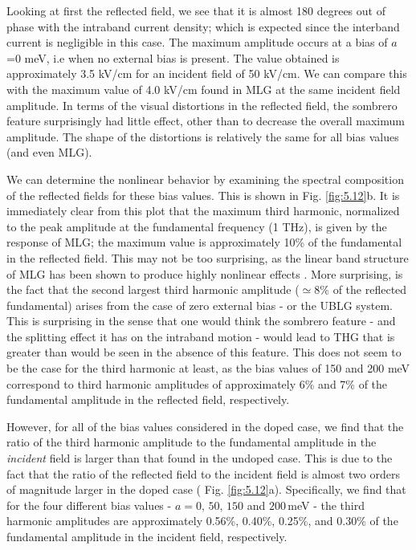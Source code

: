 \documentclass[twocolumn,secnumarabic,amssymb, nobibnotes, aps, prd, superscriptaddress]{revtex4-1}
\begin{document}
Looking at first the reflected field, we see that it is almost 180 degrees out of phase with the intraband current density; which is expected since the interband current is negligible in this case. The maximum amplitude occurs at a bias of $a$=0 meV, i.e when no external bias is present. The value obtained is approximately 3.5 kV/cm for an incident field of 50 kV/cm. We can compare this with the maximum value of 4.0 kV/cm found in MLG at the same incident field amplitude. In terms of the visual distortions in the reflected field, the sombrero feature surprisingly had little effect, other than to decrease the overall maximum amplitude. The shape of the distortions is relatively the same for all bias values (and even MLG). 

We can determine the nonlinear behavior by examining the spectral composition of the reflected fields for these bias values. This is shown in Fig. \ref{fig:5.12}b. It is immediately clear from this plot that the maximum third harmonic, normalized to the peak amplitude at the fundamental frequency (1 THz), is given by the response of MLG; the maximum value is approximately 10\% of the fundamental in the reflected field. This may not be too surprising, as the linear band structure of MLG has been shown to produce highly nonlinear effects \cite{al2014high}\cite{al2015nonperturbative}\cite{al2015optimizing}. More surprising, is the fact that the second largest third harmonic amplitude ($\simeq8\%$ of the reflected fundamental) arises from the case of zero external bias - or the UBLG system. This is surprising in the sense that one would think the sombrero feature - and the splitting effect it has on the intraband motion - would lead to THG that is greater than would be seen in the absence of this feature. This does not seem to be the case for the third harmonic at least, as the bias values of 150 and 200 meV correspond to third harmonic amplitudes of approximately 6\% and 7\% of the fundamental amplitude in the reflected field, respectively. 

However, for all of the bias values considered in the doped case, we find that the ratio of the third harmonic amplitude to the fundamental amplitude in the \textit{incident} field is larger than that found in the undoped case. This is due to the fact that the ratio of the reflected field to the incident field is almost two orders of magnitude larger in the doped case ( Fig. \ref{fig:5.12}a). Specifically, we find that for the four different bias values - $a=0,\,50,\,150$ and $200\,$meV - the third harmonic amplitudes are approximately 0.56\%, 0.40\%, 0.25\%, and 0.30\% of the fundamental amplitude in the incident field, respectively.
\end{document}
